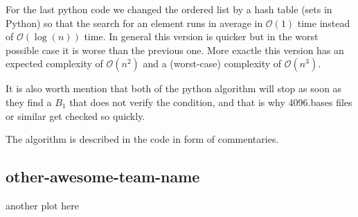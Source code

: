 \documentclass[11pt]{amsart}
\begin{document}
For the last python code we changed the ordered list by a hash table (sets in Python) so that the search for an element runs in average in $\mathcal{O}(1)$ time instead of $\mathcal{O}(\log(n))$ time.
In general this version is quicker but in the worst possible case it is worse than the previous one.
More exactle this version has an expected complexity of $\mathcal{O}(n^2)$ and a (worst-case) complexity of $\mathcal{O}(n^3)$.

It is also worth mention that both of the python algorithm will stop as soon as they find a $B_1$ that does not verify the condition, and that is why 4096.bases files or similar get checked so quickly.

The algorithm is described in the code in form of commentaries.


\subsection{other-awesome-team-name}

another plot here
\end{document}
